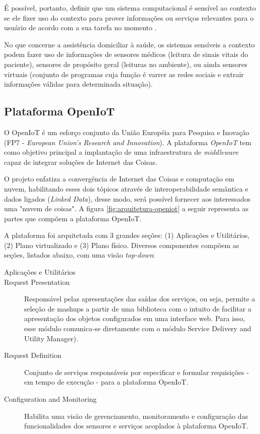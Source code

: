 É possível, portanto, definir que um sistema computacional é sensível ao contexto
se ele fizer uso do contexto para prover informações ou serviços relevantes para
o usuário de acordo com a sua tarefa no momento \cite{dey2001understanding}.

No que concerne a assistência domiciliar à saúde, os sistemas sensíveis a
contexto podem fazer uso de informações de sensores médicos (leitura de sinais 
vitais do paciente), sensores de propósito geral (leituras no ambiente), 
ou ainda sensores virtuais (conjunto de programas cuja função é varrer as redes 
sociais e extrair informações válidas para determinada situação).

\subsection{Plataforma OpenIoT}\label{subsec:openiot}

O OpenIoT é um esforço conjunto da União Européia para Pesquisa e Inovação (FP7
- \textit{European Union's Research and Innovation}). A plataforma 
\textit{OpenIoT} tem como objetivo principal a implantação de uma infraestrutura 
de \textit{middleware} capaz de integrar soluções de Internet das Coisas.

O projeto enfatiza a convergência de Internet das Coisas e computação em nuvem,
habilitando esses dois tópicos através de interoperabilidade semântica e dados
ligados (\textit{Linked Data}), desse modo, será possível fornecer aos
interessados uma "nuvem de coisas". A figura \ref{fig:arquitetura-openiot} a 
seguir representa  as partes que compõem a plataforma OpenIoT.

    
A plataforma foi arquitetada com 3 grandes seções: (1) Aplicações e Utilitários,
(2) Plano virtualizado e (3) Plano físico. Diversos componentes compõem as 
seções, listados abaixo, com uma visão \textit{top-down}:

\begin{description}
  \item [Aplicações e Utilitários]
  \item [Request Presentation] Responsável pelas apresentações das saídas dos serviços,
ou seja, permite a seleção de mashups a partir de uma biblioteca com o intuito
de facilitar a apresentação dos objetos configurados em uma interface web. Para
isso, esse módulo comunica-se diretamente com o módulo Service Delivery and
Utility Manager).

  \item [Request Definition] Conjunto de serviços responsáveis por especificar e
formular requisições - em tempo de execução - para a plataforma OpenIoT.

  \item [Configuration and Monitoring] Habilita uma visão de gerenciamento,
monitoramento e configuração das funcionalidades dos sensores e serviços
acoplados à plataforma OpenIoT.
\end{description}


